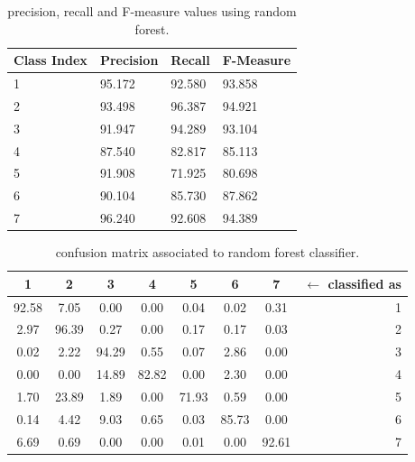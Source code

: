 \documentclass[a4paper, 10pt]{article}
\begin{document}
\begin{table}[H]
\centering
\begin{tabular}{|l|l|l|l|}
\hline
\textbf{Class Index} & \textbf{Precision} & \textbf{Recall} & \textbf{F-Measure}\\\hline
1 & 95.172 & 92.580& 93.858\\\hline
2 & 93.498 & 96.387& 94.921\\\hline
3 & 91.947 & 94.289& 93.104\\\hline
4 & 87.540 & 82.817& 85.113\\\hline
5 & 91.908 & 71.925& 80.698\\\hline
6 & 90.104 & 85.730& 87.862\\\hline
7 & 96.240 & 92.608& 94.389\\\hline
\end{tabular}
\caption{precision, recall and F-measure values using random forest.}
\label{tab:rf_test_pr}
\end{table}

\begin{table}[H]
\centering
\begin{tabular}{|*{7}{c|}r|}
\hline

1 &2 &3 &4 &5 &6 &7 & $\leftarrow$ classified as \\\hline

\cellcolor{black!15}92.58 &7.05 &0.00 &0.00 &0.04 &0.02 &0.31 & 1 \\\hline

2.97 &\cellcolor{black!15}96.39 &0.27 &0.00 &0.17 &0.17 &0.03 & 2 \\\hline

0.02 &2.22 &\cellcolor{black!15}94.29 &0.55 &0.07 &2.86 &0.00 & 3 \\\hline

0.00 &0.00 &14.89 &\cellcolor{black!15}82.82 &0.00 &2.30 &0.00 & 4 \\\hline

1.70 &23.89 &1.89 &0.00 &\cellcolor{black!15}71.93 &0.59 &0.00 & 5 \\\hline

0.14 &4.42 &9.03 &0.65 &0.03 &\cellcolor{black!15}85.73 &0.00 & 6 \\\hline

6.69 &0.69 &0.00 &0.00 &0.01 &0.00 &\cellcolor{black!15}92.61 & 7 \\\hline

\end{tabular}
 \caption{confusion matrix associated to random forest classifier.}
 \label{tab:rf_cm}
\end{table}
\end{document}

